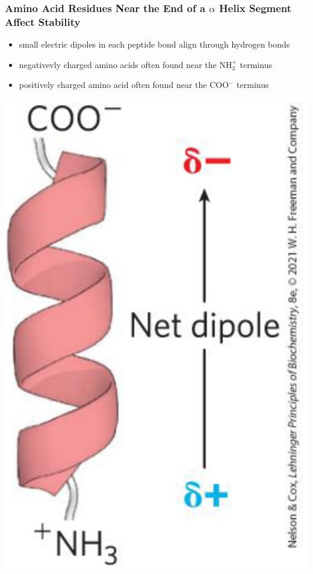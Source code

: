 \documentclass[10pt]{article}
\begin{document}
\subsubsection*{Amino Acid Residues Near the End of a $\alpha$ Helix Segment Affect Stability}
\begin{itemize}
    \item small electric dipoles in each peptide bond align through hydrogen bonds
    \item negativevly charged amino acids often found near the NH$_3^+$ terminus
    \item positively charged amino acid often found near the COO$^-$ terminus
\end{itemize}
\begin{center}
    \includegraphics*[scale=0.6]{L4_1.png}
\end{center}
\end{document}
